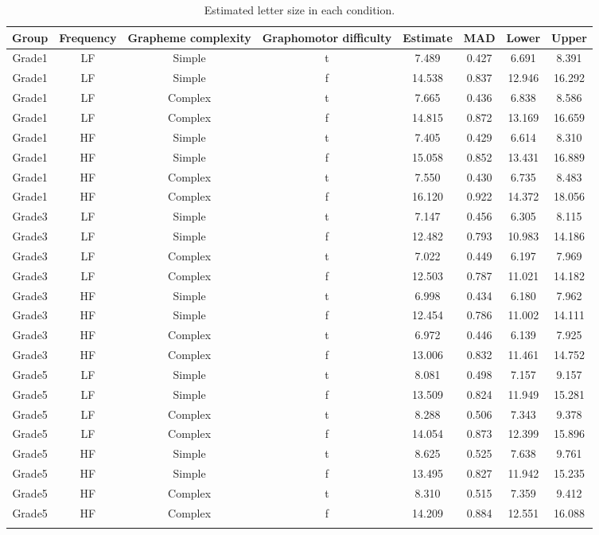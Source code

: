 \documentclass[
  11pt,
  english,
  ,doc,floatsintext]{apa6}
\begin{document}
\begin{table}[htb]

\begin{center}
\begin{threeparttable}

\caption{\label{tab:size-predictions-summary}Estimated letter size in each condition.}

\scriptsize{

\begin{tabular}{cccccccc}
\toprule
Group & \multicolumn{1}{c}{Frequency} & \multicolumn{1}{c}{Grapheme complexity} & \multicolumn{1}{c}{Graphomotor difficulty} & \multicolumn{1}{c}{Estimate} & \multicolumn{1}{c}{MAD} & \multicolumn{1}{c}{Lower} & \multicolumn{1}{c}{Upper}\\
\midrule
Grade1 & LF & Simple & t & 7.489 & 0.427 & 6.691 & 8.391\\
Grade1 & LF & Simple & f & 14.538 & 0.837 & 12.946 & 16.292\\
Grade1 & LF & Complex & t & 7.665 & 0.436 & 6.838 & 8.586\\
Grade1 & LF & Complex & f & 14.815 & 0.872 & 13.169 & 16.659\\
Grade1 & HF & Simple & t & 7.405 & 0.429 & 6.614 & 8.310\\
Grade1 & HF & Simple & f & 15.058 & 0.852 & 13.431 & 16.889\\
Grade1 & HF & Complex & t & 7.550 & 0.430 & 6.735 & 8.483\\
Grade1 & HF & Complex & f & 16.120 & 0.922 & 14.372 & 18.056\\
Grade3 & LF & Simple & t & 7.147 & 0.456 & 6.305 & 8.115\\
Grade3 & LF & Simple & f & 12.482 & 0.793 & 10.983 & 14.186\\
Grade3 & LF & Complex & t & 7.022 & 0.449 & 6.197 & 7.969\\
Grade3 & LF & Complex & f & 12.503 & 0.787 & 11.021 & 14.182\\
Grade3 & HF & Simple & t & 6.998 & 0.434 & 6.180 & 7.962\\
Grade3 & HF & Simple & f & 12.454 & 0.786 & 11.002 & 14.111\\
Grade3 & HF & Complex & t & 6.972 & 0.446 & 6.139 & 7.925\\
Grade3 & HF & Complex & f & 13.006 & 0.832 & 11.461 & 14.752\\
Grade5 & LF & Simple & t & 8.081 & 0.498 & 7.157 & 9.157\\
Grade5 & LF & Simple & f & 13.509 & 0.824 & 11.949 & 15.281\\
Grade5 & LF & Complex & t & 8.288 & 0.506 & 7.343 & 9.378\\
Grade5 & LF & Complex & f & 14.054 & 0.873 & 12.399 & 15.896\\
Grade5 & HF & Simple & t & 8.625 & 0.525 & 7.638 & 9.761\\
Grade5 & HF & Simple & f & 13.495 & 0.827 & 11.942 & 15.235\\
Grade5 & HF & Complex & t & 8.310 & 0.515 & 7.359 & 9.412\\
Grade5 & HF & Complex & f & 14.209 & 0.884 & 12.551 & 16.088\\
\bottomrule
\addlinespace
\end{tabular}

}
\end{threeparttable}
\end{center}
\end{table}
\end{document}
